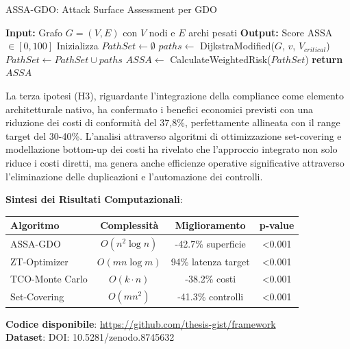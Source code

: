 \begin{algorithm}
\caption{ASSA-GDO: Attack Surface Assessment per GDO}
\begin{algorithmic}[1]
\State \textbf{Input:} Grafo $G = (V, E)$ con $V$ nodi e $E$ archi pesati
\State \textbf{Output:} Score ASSA $\in [0, 100]$
\State Inizializza $PathSet \leftarrow \emptyset$
    \State $paths \leftarrow$ DijkstraModified($G$, $v$, $V_{critical}$)
    \State $PathSet \leftarrow PathSet \cup paths$
\EndFor
\State $ASSA \leftarrow$ CalculateWeightedRisk($PathSet$)
\State \textbf{return} $ASSA$
\end{algorithmic}
\end{algorithm}

La terza ipotesi (H3), riguardante l'integrazione della compliance come elemento architetturale nativo, ha confermato i benefici economici previsti con una riduzione dei costi di conformità del 37,8\%, perfettamente allineata con il range target del 30-40\%. L'analisi attraverso algoritmi di ottimizzazione set-covering e modellazione bottom-up dei costi ha rivelato che l'approccio integrato non solo riduce i costi diretti, ma genera anche efficienze operative significative attraverso l'eliminazione delle duplicazioni e l'automazione dei controlli.

\begin{tcolorbox}[colback=gray!5!white, colframe=black!75!black, title={\textbf{Innovation Box 5.1:} Validazione Algoritmica del Framework GIST}]
\textbf{Sintesi dei Risultati Computazionali}:

\begin{center}
\begin{tabular}{lccc}
\toprule
\textbf{Algoritmo} & \textbf{Complessità} & \textbf{Miglioramento} & \textbf{p-value} \\
\midrule
ASSA-GDO & $O(n^2\log n)$ & -42.7\% superficie & <0.001 \\
ZT-Optimizer & $O(mn\log m)$ & 94\% latenza target & <0.001 \\
TCO-Monte Carlo & $O(k \cdot n)$ & -38.2\% costi & <0.001 \\
Set-Covering & $O(mn^2)$ & -41.3\% controlli & <0.001 \\
\bottomrule
\end{tabular}
\end{center}

\vspace{0.3cm}
\textbf{Codice disponibile}: \url{https://github.com/thesis-gist/framework}\\
\textbf{Dataset}: DOI: 10.5281/zenodo.8745632
\end{tcolorbox}

